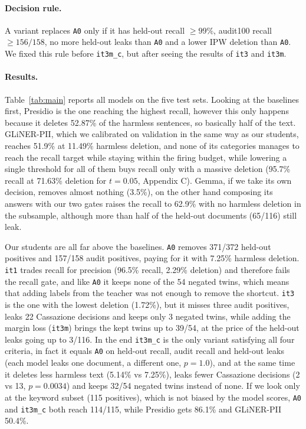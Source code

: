 \documentclass[11pt]{article}
\begin{document}
\paragraph{Decision rule.} A variant replaces \texttt{A0} only if it has held-out recall $\geq 99\%$, audit100 recall $\geq 156/158$, no more held-out leaks than \texttt{A0} and a lower IPW deletion than \texttt{A0}. We fixed this rule before \texttt{it3m\_c}, but after seeing the results of \texttt{it3} and \texttt{it3m}.

\paragraph{Results.} Table~\ref{tab:main} reports all models on the five test sets. Looking at the baselines first, Presidio is the one reaching the highest recall, however this only happens because it deletes 52.87\% of the harmless sentences, so basically half of the text. GLiNER-PII, which we calibrated on validation in the same way as our students, reaches 51.9\% at 11.49\% harmless deletion, and none of its categories manages to reach the recall target while staying within the firing budget, while lowering a single threshold for all of them buys recall only with a massive deletion (95.7\% recall at 71.63\% deletion for $t=0.05$, Appendix C). Gemma, if we take its own decision, removes almost nothing (3.5\%), on the other hand composing its answers with our two gates raises the recall to 62.9\% with no harmless deletion in the subsample, although more than half of the held-out documents (65/116) still leak.

Our students are all far above the baselines. \texttt{A0} removes 371/372 held-out positives and 157/158 audit positives, paying for it with 7.25\% harmless deletion. \texttt{it1} trades recall for precision (96.5\% recall, 2.29\% deletion) and therefore fails the recall gate, and like \texttt{A0} it keeps none of the 54 negated twins, which means that adding labels from the teacher was not enough to remove the shortcut. \texttt{it3} is the one with the lowest deletion (1.72\%), but it misses three audit positives, leaks 22 Cassazione decisions and keeps only 3 negated twins, while adding the margin loss (\texttt{it3m}) brings the kept twins up to 39/54, at the price of the held-out leaks going up to 3/116. In the end \texttt{it3m\_c} is the only variant satisfying all four criteria, in fact it equals \texttt{A0} on held-out recall, audit recall and held-out leaks (each model leaks one document, a different one, $p=1.0$), and at the same time it deletes less harmless text (5.14\% vs 7.25\%), leaks fewer Cassazione decisions (2 vs 13, $p=0.0034$) and keeps 32/54 negated twins instead of none. If we look only at the keyword subset (115 positives), which is not biased by the model scores, \texttt{A0} and \texttt{it3m\_c} both reach 114/115, while Presidio gets 86.1\% and GLiNER-PII 50.4\%.
\end{document}

